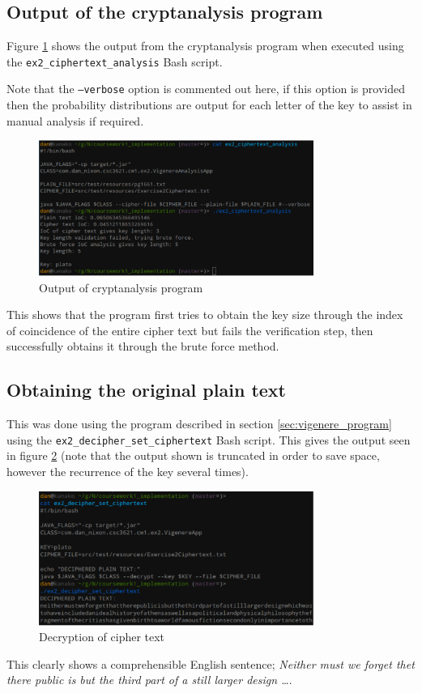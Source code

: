 \documentclass[a4paper]{article}
\begin{document}
\subsection{Output of the cryptanalysis program}
\label{sec:cryptanalysis_output}

Figure \ref{fig:cryptanalysis_output} shows the output from the cryptanalysis
program when executed using the \texttt{ex2\_ciphertext\_analysis} Bash script.

Note that the \texttt{--verbose} option is commented out here, if this option is
provided then the probability distributions are output for each letter of the
key to assist in manual analysis if required.

\begin{figure}[h!]
  \centering
  \includegraphics[width=0.8\textwidth]{graphics/ex2_cryptanalysis_output.eps}
  \caption{Output of cryptanalysis program}
  \label{fig:cryptanalysis_output}
\end{figure}

This shows that the program first tries to obtain the key size through the index
of coincidence of the entire cipher text but fails the verification step, then
successfully obtains it through the brute force method.

\subsection{Obtaining the original plain text}
\label{sec:plaintext}

This was done using the program described in section \ref{sec:vigenere_program}
using the \texttt{ex2\_decipher\_set\_ciphertext} Bash script. This gives the
output seen in figure \ref{fig:plaintext_output} (note that the output shown
is truncated in order to save space, however the recurrence of the key several
times).

\begin{figure}[h!]
  \centering
  \includegraphics[width=0.8\textwidth]{graphics/ex2_plaintext_output.eps}
  \caption{Decryption of cipher text}
  \label{fig:plaintext_output}
\end{figure}

This clearly shows a comprehensible English sentence; \textit{Neither must we
forget thet there public is but the third part of a still larger design \ldots}.
\end{document}
